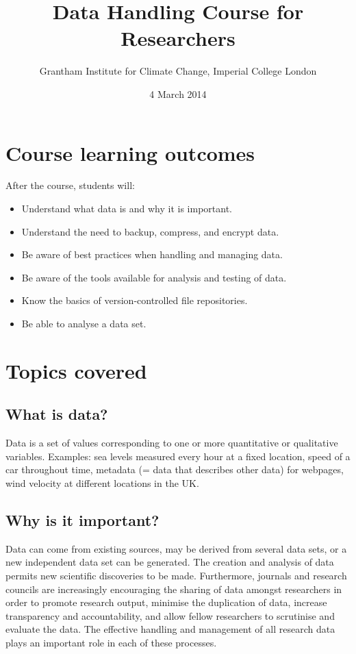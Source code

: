 \documentclass[a4paper,11pt]{article}
\title{Data Handling Course for Researchers}
\date{4 March 2014}
\author{Grantham Institute for Climate Change, Imperial College London}
\begin{document}
\maketitle
\setlength{\parskip}{0.3cm}
\setlength{\parindent}{0cm}

\section{Course learning outcomes}
After the course, students will:
\begin{itemize}
   \item Understand what data is and why it is important.
   \item Understand the need to backup, compress, and encrypt data.
   \item Be aware of best practices when handling and managing data.
   \item Be aware of the tools available for analysis and testing of data.
   \item Know the basics of version-controlled file repositories.
   \item Be able to analyse a data set.
\end{itemize}

\section{Topics covered}

\subsection{What is data?}
Data is a set of values corresponding to one or more quantitative or qualitative variables. Examples: sea levels measured every hour at a fixed location, speed of a car throughout time, metadata (= data that describes other data) for webpages, wind velocity at different locations in the UK. 

\subsection{Why is it important?}
Data can come from existing sources, may be derived from several data sets, or a new independent data set can be generated. The creation and analysis of data permits new scientific discoveries to be made. Furthermore, journals and research councils are increasingly encouraging the sharing of data amongst researchers in order to promote research output, minimise the duplication of data, increase transparency and accountability, and allow fellow researchers to scrutinise and evaluate the data. The effective handling and management of all research data plays an important role in each of these processes.
\end{document}
